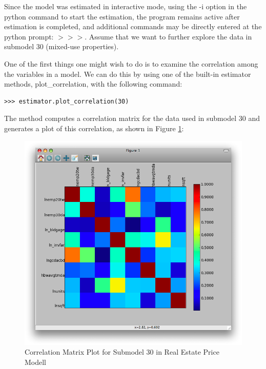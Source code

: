 Since the model was estimated in interactive mode, using the -i option in the python command to start the estimation, the program remains active after estimation is completed, and additional commands may be directly entered at the python prompt: $>>>$.  Assume that we want to further explore the data in submodel 30 (mixed-use properties).  

One of the first things one might wish to do is to examine the correlation among the variables in a model.  We can do this by using one of the built-in estimator methods, plot\_correlation, with the following command:

\begin{lstlisting}
>>> estimator.plot_correlation(30)
\end{lstlisting}

The method computes a correlation matrix for the data used in submodel 30 and generates a plot of this correlation, as shown in Figure \ref{fig:correlation30}:

\begin{figure}[htp]
\begin{center}
\includegraphics[scale=0.35]{graphics/correlation30.png}
\end{center}
\caption{Correlation Matrix Plot for Submodel 30 in Real Estate Price Modell}
\label{fig:correlation30}
\end{figure}

